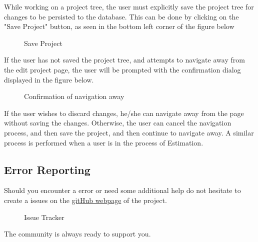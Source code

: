While working on a project tree, the user must explicitly save the project tree for changes to be persisted to the database. This can be done by clicking on the "Save Project" button, as seen in the bottom left corner of the figure below

	\begin{figure}[H]
	    	\centering
	    	\caption{Save Project}
	    	\label{fig: Save Project}
   	\end{figure}

If the user has not saved the project tree, and attempts to navigate away from the edit project page, the user will be prompted with the confirmation dialog displayed in the figure below.

	\begin{figure}[H]
	    	\centering
	    	\caption{Confirmation of navigation away}
	    	\label{fig: Confirmation}
   	\end{figure}

If the user wishes to discard changes, he/she can navigate away from the page without saving the changes. Otherwise, the user can cancel the navigation process, and then save the project, and then continue to navigate away. A similar process is performed when a user is in the process of Estimation.
\subsection{Error Reporting}
Should you encounter a error or need some additional help do not hesitate to create a issues on the 
\href{https://github.com/FrikkieSnyman/COS301_GroupProject}{gitHub webpage} of the project.
	\begin{figure}[H]
	    	\centering
	    	\caption{Issue Tracker}
	    	\label{fig: Issue Tracker}
   	\end{figure}
The community is always ready to support you.